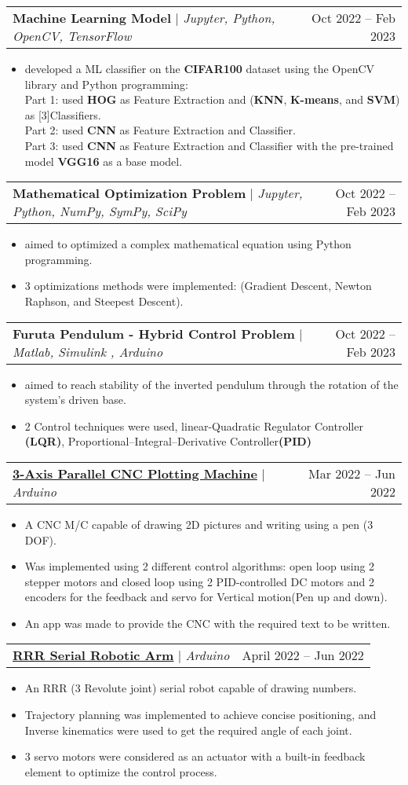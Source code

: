 \documentclass[letterpaper,11pt]{article}
\makeatletter
\newcommand{\resumeItem}[1]{
  \item\small{
    {#1 \vspace{-2pt}}
  }
}
\newcommand{\resumeProjectHeading}[2]{
    \item
    \begin{tabular*}{0.97\textwidth}{l@{\extracolsep{\fill}}r}
      \small#1 & #2 \\
    \end{tabular*}\vspace{-7pt}
}
\newcommand{\resumeItemListStart}{\begin{itemize}}
\newcommand{\resumeItemListEnd}{\end{itemize}\vspace{-5pt}}
\makeatother
\begin{document}
      \resumeProjectHeading
        {\textbf{Machine Learning Model} $|$ \emph{Jupyter, Python, OpenCV, TensorFlow}}{Oct 2022 -- Feb 2023}
        \resumeItemListStart
          \resumeItem{developed a ML classifier on the \textbf{CIFAR100} dataset using the OpenCV library and Python programming:\\
          Part 1: used \textbf{HOG} as Feature Extraction and (\textbf{KNN}, \textbf{K-means}, and \textbf{SVM}) as [3]Classifiers.\\
          Part 2: used \textbf{CNN} as Feature Extraction and Classifier.\\
          Part 3: used \textbf{CNN} as Feature Extraction and Classifier with the pre-trained model \textbf{VGG16} as a base model.}
        \resumeItemListEnd
          
      \resumeProjectHeading
        {\textbf{Mathematical Optimization Problem} $|$ \emph{Jupyter, Python, NumPy, SymPy, SciPy}}{Oct 2022 -- Feb 2023}
        \resumeItemListStart
          \resumeItem{aimed to optimized a complex mathematical equation using Python programming.}
          \resumeItem{3 optimizations methods were implemented: (Gradient Descent, Newton Raphson, and Steepest Descent).}
        \resumeItemListEnd

      \resumeProjectHeading
      {\textbf{Furuta Pendulum - Hybrid Control Problem} $|$ \emph{Matlab, Simulink , Arduino}}{Oct 2022 -- Feb 2023}
      \resumeItemListStart
        \resumeItem{aimed to reach stability of the inverted pendulum through the rotation of the system's driven base.}
        \resumeItem{2 Control techniques were used, linear-Quadratic Regulator Controller \textbf{(LQR)}, Proportional–Integral–Derivative Controller\textbf{(PID)}}
      \resumeItemListEnd  

      \resumeProjectHeading
        {\textbf{\href{https://github.com/MostafaQusit/CNC-Plotting-Machine}{3-Axis Parallel CNC Plotting Machine}} $|$ \emph{Arduino}}{Mar 2022 -- Jun 2022}
        \resumeItemListStart
          \resumeItem{A CNC M/C capable of drawing 2D pictures and writing using a pen (3 DOF).}
          \resumeItem{Was implemented using 2 different control algorithms: open loop using 2 stepper motors and closed loop using 2 PID-controlled DC motors and 2 encoders for the feedback and servo for Vertical motion(Pen up and down).}
          \resumeItem{An app was made to provide the CNC with the required text to be written.}
        \resumeItemListEnd

      \resumeProjectHeading
        {\textbf{\href{https://github.com/MostafaQusit/RRR-Serial-Robotic-Arm}{RRR Serial Robotic Arm}} $|$ \emph{Arduino}}{April 2022 -- Jun 2022}
        \resumeItemListStart
          \resumeItem{An RRR (3 Revolute joint) serial robot capable of drawing numbers.}
          \resumeItem{Trajectory planning was implemented to achieve concise positioning, and Inverse kinematics were used to get the required angle of each joint.}
          \resumeItem{3 servo motors were considered as an actuator with a built-in feedback element to optimize the control process.}
        \resumeItemListEnd
      
\end{document}
